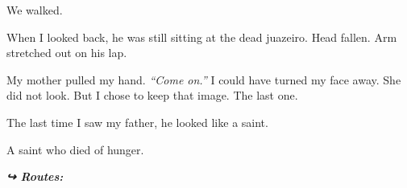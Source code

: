 \noindent We walked.

\noindent When I looked back, he was still sitting at the dead juazeiro. Head fallen. Arm stretched out on his lap.

\noindent My mother pulled my hand. \textit{\textquotedblleft{}Come on.\textquotedblright{}} I could have turned my face away. She did not look. But I chose to keep that image. The last one.

\noindent The last time I saw my father, he looked like a saint.

\noindent A saint who died of hunger.

\vspace{0.5em}
\noindent\textit{\textbf{↪ Routes:}  \rotasep {} \rotasep {}}

